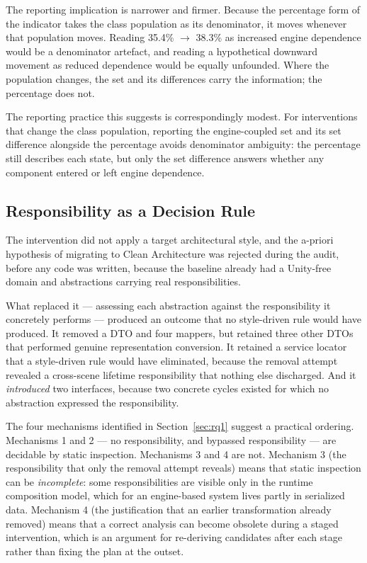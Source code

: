 \documentclass{sbc2019}%
\begin{document}
The reporting implication is narrower and firmer. Because the percentage form of
the indicator takes the class population as its denominator, it moves whenever
that population moves. Reading 35.4\% $\rightarrow$ 38.3\% as increased engine
dependence would be a denominator artefact, and reading a hypothetical downward
movement as reduced dependence would be equally unfounded. Where the population
changes, the set and its differences carry the information; the percentage does
not.

The reporting practice this suggests is correspondingly modest. For
interventions that change the class population, reporting the engine-coupled set
and its set difference alongside the percentage avoids denominator ambiguity: the
percentage still describes each state, but only the set difference answers
whether any component entered or left engine dependence.

\subsection{Responsibility as a Decision Rule}

The intervention did not apply a target architectural style, and the a-priori
hypothesis of migrating to Clean Architecture was rejected during the audit,
before any code was written, because the baseline already had a Unity-free
domain and abstractions carrying real responsibilities.

What replaced it --- assessing each abstraction against the responsibility it
concretely performs --- produced an outcome that no style-driven rule would have
produced. It removed a DTO and four mappers, but retained three other DTOs that
performed genuine representation conversion. It retained a service locator that
a style-driven rule would have eliminated, because the removal attempt revealed a
cross-scene lifetime responsibility that nothing else discharged. And it
\emph{introduced} two interfaces, because two concrete cycles existed for which
no abstraction expressed the responsibility.

The four mechanisms identified in Section~\ref{sec:rq1} suggest a practical
ordering. Mechanisms 1 and 2 --- no responsibility, and bypassed responsibility
--- are decidable by static inspection. Mechanisms 3 and 4 are not. Mechanism 3
(the responsibility that only the removal attempt reveals) means that static
inspection can be \emph{incomplete}: some responsibilities are visible only in
the runtime composition model, which for an engine-based system lives partly in
serialized data. Mechanism 4 (the justification that an earlier transformation
already removed) means that a correct analysis can become obsolete during a
staged intervention, which is an argument for re-deriving candidates after each
stage rather than fixing the plan at the outset.
\end{document}
